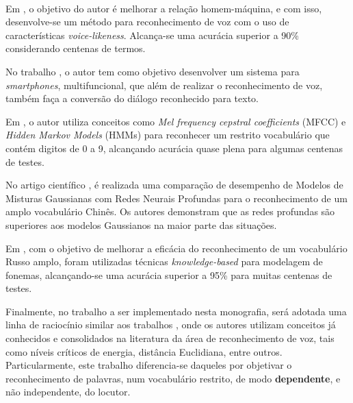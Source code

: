 \documentclass[a4paper,12pt,twoside,openright]{report}
\begin{document}
\\
\par Em \cite{Laughing_Voice_Recognition}, o objetivo do autor \'{e} melhorar a rela{\c c}\~{a}o homem-m\'{a}quina, e com isso, desenvolve-se um m\'{e}todo para reconhecimento de voz com o uso de caracter\'{i}sticas \textit{voice-likeness}. Alcan{\c c}a-se uma acur\'{a}cia superior a 90\% considerando centenas de termos. 
\\
\par No trabalho \cite{A_Smartphone-Based_Multi-Functional_Hearing}, o autor tem como objetivo desenvolver um sistema para \textit{smartphones}, multifuncional, que al\'{e}m de realizar o reconhecimento de voz, tamb\'{e}m fa{\c c}a a convers\~{a}o do di\'{a}logo reconhecido para texto.
\\
\par Em \cite{Reconhecimento_voz_palavras_isoladas}, o autor utiliza conceitos como \textit{Mel frequency cepstral coefficients} (MFCC) e  \textit{Hidden Markov Models} (HMMs) para reconhecer um restrito vocabul\'{a}rio que cont\'{e}m digitos de 0 a 9, alcan\c{c}ando acur\'{a}cia quase plena para algumas centenas de testes.
\\
\par No artigo cient\'{i}fico \cite{reconhecimento_vocabulario_chines}, \'{e} realizada uma compara{\c c}\~{a}o de desempenho de Modelos de Misturas Gaussianas com Redes Neurais Profundas para o reconhecimento de um amplo vocabul\'{a}rio Chin\^{e}s. Os autores demonstram que as redes profundas s\~{a}o superiores aos modelos Gaussianos na maior parte das situa\c{c}\~{o}es. 
\\
\par Em \cite{Reconhecimento_vocabulario_russo}, com o objetivo de melhorar a efic\'{a}cia do reconhecimento de um vocabul\'{a}rio Russo amplo, foram utilizadas t\'{e}cnicas \textit{knowledge-based} para modelagem de fonemas, alcan\c{c}ando-se uma acur\'{a}cia superior a 95\% para muitas centenas de testes.
\\
\par Finalmente, no trabalho a ser implementado nesta monografia, ser\'{a} adotada uma linha de racioc\'{i}nio similar aos trabalhos \cite{Marcel_Kfouri,Vinicius_Francisco,Ana_Paula}, onde os autores utilizam conceitos j\'{a} conhecidos e consolidados na literatura da \'{a}rea de reconhecimento de voz, tais como n\'{i}veis cr\'{i}ticos de energia, dist\^{a}ncia Euclidiana, entre outros. Particularmente, este trabalho diferencia-se daqueles por objetivar o reconhecimento de palavras, num vocabul\'{a}rio restrito, de modo \textbf{dependente}, e n\~{a}o independente, do locutor.
\end{document}
